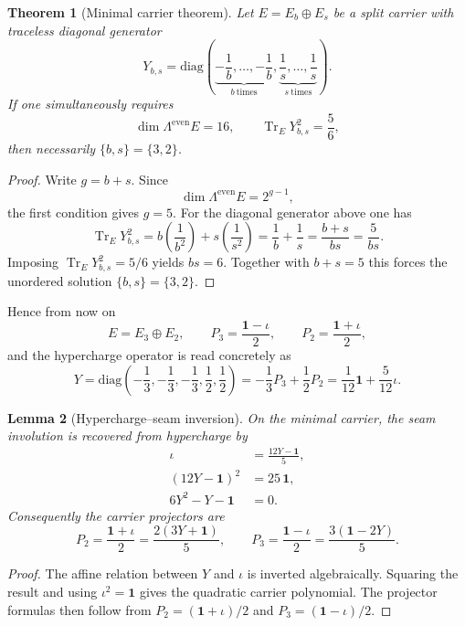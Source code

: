 \documentclass[11pt,a4paper]{article}
\newtheorem{theorem}{Theorem}[section]
\newtheorem{lemma}[theorem]{Lemma}
\theoremstyle{definition}
\theoremstyle{remark}
\DeclareMathOperator{\tr}{Tr}
\newcommand{\inv}{\iota}
\begin{document}
\begin{theorem}[Minimal carrier theorem]
Let $E=E_b\oplus E_s$ be a split carrier with traceless diagonal generator
\[
Y_{b,s}
=
\mathrm{diag}\!\left(
\underbrace{-\frac1b,\ldots,-\frac1b}_{b\ \text{times}},
\underbrace{\frac1s,\ldots,\frac1s}_{s\ \text{times}}
\right).
\]
If one simultaneously requires
\begin{equation}
\label{eq:minimal-carrier-conditions}
\dim \Lambda^{\mathrm{even}}E=16,
\qquad
\tr_E Y_{b,s}^2=\frac56,
\end{equation}
then necessarily $\{b,s\}=\{3,2\}$.
\end{theorem}

\begin{proof}
Write $g=b+s$. Since
\[
\dim \Lambda^{\mathrm{even}}E=2^{g-1},
\]
the first condition gives $g=5$. For the diagonal generator above one has
\[
\tr_E Y_{b,s}^2
=
b\left(\frac{1}{b^2}\right)+s\left(\frac{1}{s^2}\right)
=
\frac1b+\frac1s
=
\frac{b+s}{bs}
=
\frac{5}{bs}.
\]
Imposing $\tr_E Y_{b,s}^2=5/6$ yields $bs=6$. Together with $b+s=5$ this forces the unordered solution $\{b,s\}=\{3,2\}$.
\end{proof}

Hence from now on
\[
E=E_3\oplus E_2,
\qquad
P_3=\frac{\mathbf 1-\inv}{2},
\qquad
P_2=\frac{\mathbf 1+\inv}{2},
\]
and the hypercharge operator is read concretely as
\begin{equation}
\label{eq:explicit-hypercharge}
Y
=
\mathrm{diag}\!\left(-\frac13,-\frac13,-\frac13,\frac12,\frac12\right)
=
-\frac13 P_3+\frac12 P_2
=
\frac1{12}\mathbf 1+\frac5{12}\inv.
\end{equation}

\begin{lemma}[Hypercharge--seam inversion]
On the minimal carrier, the seam involution is recovered from hypercharge by
\begin{align}
\inv&=\frac{12Y-\mathbf 1}{5},
\label{eq:hypercharge-seam-inversion}\\
(12Y-\mathbf 1)^2&=25\,\mathbf 1,
\nonumber\\
6Y^2-Y-\mathbf 1&=0.
\label{eq:carrier-polynomial}
\end{align}
Consequently the carrier projectors are
\[
P_2=\frac{\mathbf 1+\inv}{2}=\frac{2(3Y+\mathbf 1)}{5},
\qquad
P_3=\frac{\mathbf 1-\inv}{2}=\frac{3(\mathbf 1-2Y)}{5}.
\]
\end{lemma}

\begin{proof}
The affine relation between $Y$ and $\inv$ is inverted algebraically. Squaring the result and using $\inv^2=\mathbf 1$ gives the quadratic carrier polynomial. The projector formulas then follow from $P_2=(\mathbf 1+\inv)/2$ and $P_3=(\mathbf 1-\inv)/2$.
\end{proof}
\end{document}
